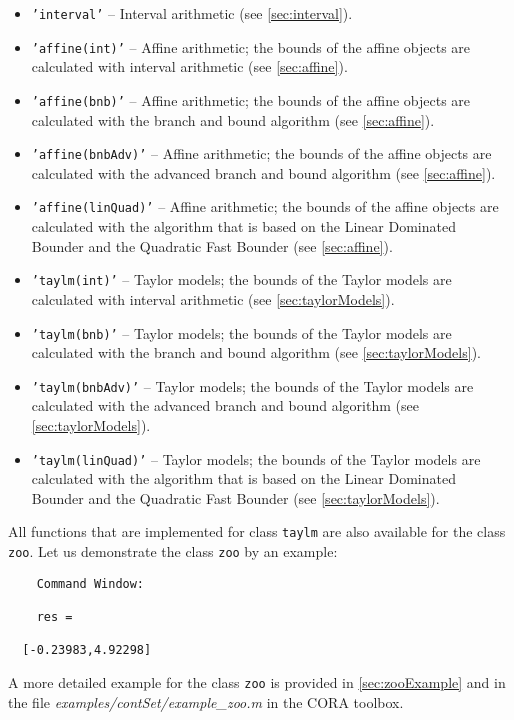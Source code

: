 \begin{itemize}
 \item \texttt{'interval'} -- Interval arithmetic (see \cref{sec:interval}).
 \item \texttt{'affine(int)'} -- Affine arithmetic; the bounds of the affine objects are calculated with interval arithmetic (see \cref{sec:affine}).
 \item \texttt{'affine(bnb)'} -- Affine arithmetic; the bounds of the affine objects are calculated with the branch and bound algorithm (see \cref{sec:affine}).
 \item \texttt{'affine(bnbAdv)'} -- Affine arithmetic; the bounds of the affine objects are calculated with the advanced branch and bound algorithm (see \cref{sec:affine}).
 \item \texttt{'affine(linQuad)'} -- Affine arithmetic; the bounds of the affine objects are calculated with the algorithm that is based on the Linear Dominated Bounder and the Quadratic Fast Bounder (see \cref{sec:affine}).
 \item \texttt{'taylm(int)'} -- Taylor models; the bounds of the Taylor models are calculated with interval arithmetic (see \cref{sec:taylorModels}).
 \item \texttt{'taylm(bnb)'} -- Taylor models; the bounds of the Taylor models are calculated with the branch and bound algorithm (see \cref{sec:taylorModels}).
 \item \texttt{'taylm(bnbAdv)'} -- Taylor models; the bounds of the Taylor models are calculated with the advanced branch and bound algorithm (see \cref{sec:taylorModels}).
 \item \texttt{'taylm(linQuad)'} -- Taylor models; the bounds of the Taylor models are calculated with the algorithm that is based on the Linear Dominated Bounder and the Quadratic Fast Bounder (see \cref{sec:taylorModels}).
\end{itemize} 

All functions that are implemented for class \texttt{taylm} are also available for the class \texttt{zoo}. Let us demonstrate the class \texttt{zoo} by an example:

\begin{center}
\begin{minipage}[t]{0.50\textwidth}
	\vspace{10pt}
	\footnotesize
	
\end{minipage}
\begin{minipage}[t]{0.25\textwidth}
	\vspace{10pt}

	\begin{verbatim}	
	Command Window:
	
	res =

  [-0.23983,4.92298]
	\end{verbatim}
\end{minipage}
\end{center}

A more detailed example for the class \texttt{zoo} is provided in \cref{sec:zooExample} and in the file \textit{examples/contSet/example\_zoo.m} in the CORA toolbox.